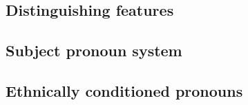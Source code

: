     \subsection{Distinguishing features}
    \subsection{Subject pronoun system}
    \subsection{Ethnically conditioned pronouns} %

